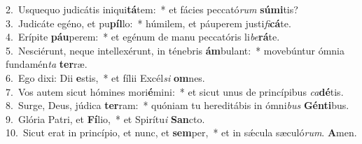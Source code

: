 {2.~}Usquequo judicátis iniqui\textbf{tá}tem:~* et fácies peccató\textit{rum} \textbf{sú}\textbf{mi}tis?\\
{3.~}Judicáte egéno, et pu\textbf{píl}lo:~* húmilem, et páuperem justi\textit{fi}\textbf{cá}te.\\
{4.~}Erípite \textbf{páu}perem:~* et egénum de manu peccatóris li\textit{be}\textbf{rá}te.\\
{5.~}Nesciérunt, neque intellexérunt, in ténebris \textbf{ám}bulant:~* movebúntur ómnia fundamén\textit{ta} \textbf{ter}ræ.\\
{6.~}Ego dixi: Dii \textbf{e}stis,~* et fílii Excél\textit{si} \textbf{om}nes.\\
{7.~}Vos autem sicut hómines mori\textbf{é}mini:~* et sicut unus de princípibus \textit{ca}\textbf{dé}tis.\\
{8.~}Surge, Deus, júdica \textbf{ter}ram:~* quóniam tu hereditábis in ómni\textit{bus} \textbf{Gén}\textbf{ti}bus.\\
{9.~}Glória Patri, et \textbf{Fí}lio,~* et Spirítu\textit{i} \textbf{San}cto.\\
{10.~}Sicut erat in princípio, et nunc, et \textbf{sem}per,~* et in sǽcula sæculó\textit{rum}. \textbf{A}men.\\
